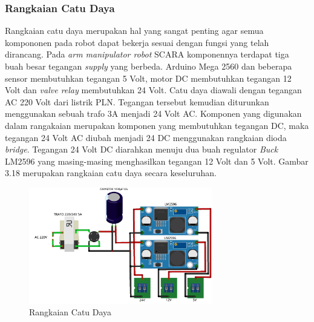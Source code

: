 \subsubsection{Rangkaian Catu Daya}
Rangkaian catu daya merupakan hal yang sangat penting agar semua kompononen pada robot dapat bekerja sesuai dengan fungsi yang telah dirancang. Pada \textit{arm manipulator robot} SCARA komponennya terdapat tiga buah besar tegangan \textit{supply} yang berbeda. Arduino Mega 2560 dan beberapa sensor membutuhkan tegangan 5 Volt, motor DC membutuhkan tegangan 12 Volt dan \textit{valve relay} membutuhkan 24 Volt. Catu daya diawali dengan tegangan AC 220 Volt dari listrik PLN. Tegangan tersebut kemudian diturunkan menggunakan sebuah trafo 3A menjadi 24 Volt AC. Komponen yang digunakan dalam rangakaian merupakan komponen yang membutuhkan tegangan DC, maka tegangan 24 Volt AC diubah menjadi 24 DC menggunakan rangkaian dioda \textit{bridge}. Tegangan 24 Volt DC diarahkan menuju dua buah regulator \textit{Buck} LM2596 yang masing-masing menghasilkan tegangan 12 Volt dan 5 Volt. Gambar 3.18 merupakan rangkaian catu daya secara keseluruhan.
\begin{figure}[H]
	\centering
	\includegraphics[width=8cm]{gambar/catudaya_bb.png}
	\caption{Rangkaian Catu Daya}
\end{figure}
